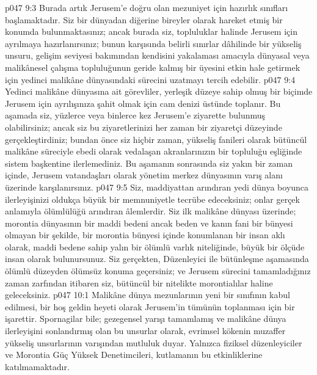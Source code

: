 \vs p047 9:3 Burada artık Jerusem’e doğru olan mezuniyet için hazırlık sınıfları başlamaktadır. Siz bir dünyadan diğerine bireyler olarak hareket etmiş bir konumda bulunmaktasınız; ancak burada siz, topluluklar halinde Jerusem için ayrılmaya hazırlanırsınız; bunun karşısında belirli sınırlar dâhilinde bir yükseliş unsuru, gelişim seviyesi bakımından kendisini yakalaması amacıyla dünyasal veya malikânesel çalışma topluluğunun geride kalmış bir üyesini etkin hale getirmek için yedinci malikâne dünyasındaki sürecini uzatmayı tercih edebilir.
\vs p047 9:4 Yedinci malikâne dünyasına ait görevliler, yerleşik düzeye sahip olmuş bir biçimde Jerusem için ayrılışınıza şahit olmak için cam denizi üstünde toplanır. Bu aşamada siz, yüzlerce veya binlerce kez Jerusem’e ziyarette bulunmuş olabilirsiniz; ancak siz bu ziyaretlerinizi her zaman bir ziyaretçi düzeyinde gerçekleştirdiniz; bundan önce siz hiçbir zaman, yükseliş fanileri olarak bütüncül malikâne süreciyle ebedi olarak vedalaşan akranlarınızın bir topluluğu eşliğinde sistem başkentine ilerlemediniz. Bu aşamanın sonrasında siz yakın bir zaman içinde, Jerusem vatandaşları olarak yönetim merkez dünyasının varış alanı üzerinde karşılanırsınız.
\vs p047 9:5 Siz, maddiyattan arındıran yedi dünya boyunca ilerleyişinizi oldukça büyük bir memnuniyetle tecrübe edeceksiniz; onlar gerçek anlamıyla ölümlülüğü arındıran âlemlerdir. Siz ilk malikâne dünyası üzerinde; morontia dünyasının bir maddi bedeni ancak beden ve kanın fani bir bünyesi olmayan bir şekilde, bir morontia bünyesi içinde konumlanan bir insan aklı olarak, maddi bedene sahip yalın bir ölümlü varlık niteliğinde, büyük bir ölçüde insan olarak bulunursunuz. Siz gerçekten, Düzenleyici ile bütünleşme aşamasında ölümlü düzeyden ölümsüz konuma geçersiniz; ve Jerusem sürecini tamamladığınız zaman zarfından itibaren siz, bütüncül bir nitelikte morontialılar haline geleceksiniz.
\vs p047 10:1 Malikâne dünya mezunlarının yeni bir sınıfının kabul edilmesi, bir hoş geldin heyeti olarak Jerusem’in tümünün toplanması için bir işarettir. Spornagilar bile; gezegensel yarışı tamamlamış ve malikâne dünya ilerleyişini sonlandırmış olan bu unsurlar olarak, evrimsel kökenin muzaffer yükseliş unsurlarının varışından mutluluk duyar. Yalnızca fiziksel düzenleyiciler ve Morontia Güç Yüksek Denetimcileri, kutlamanın bu etkinliklerine katılmamaktadır.
